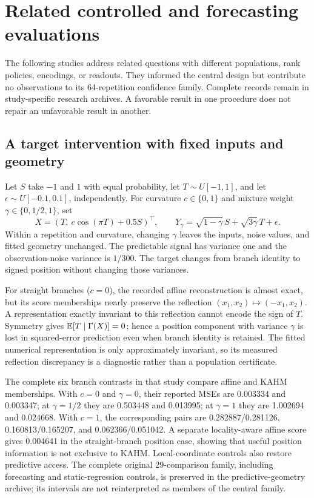 \section{Related controlled and forecasting evaluations}\label{sup:related}
The following studies address related questions with different populations, rank policies, encodings, or readouts. They informed the central design but contribute no observations to its 64-repetition confidence family. Complete records remain in study-specific research archives. A favorable result in one procedure does not repair an unfavorable result in another.

\subsection{A target intervention with fixed inputs and geometry}
Let $S$ take $-1$ and $1$ with equal probability, let $T\sim U[-1,1]$, and let $\epsilon\sim U[-0.1,0.1]$, independently. For curvature $c\in\{0,1\}$ and mixture weight $\gamma\in\{0,1/2,1\}$, set
\[
 X=(T,\ c\cos(\pi T)+0.5S)^\top,\qquad
 Y_\gamma=\sqrt{1-\gamma}\,S+\sqrt{3\gamma}\,T+\epsilon.
\]
Within a repetition and curvature, changing $\gamma$ leaves the inputs, noise values, and fitted geometry unchanged. The predictable signal has variance one and the observation-noise variance is $1/300$. The target changes from branch identity to signed position without changing those variances.

For straight branches ($c=0$), the recorded affine reconstruction is almost exact, but its score memberships nearly preserve the reflection $(x_1,x_2)\mapsto(-x_1,x_2)$. A representation exactly invariant to this reflection cannot encode the sign of $T$. Symmetry gives $\mathbb E[T\mid\Gamma(X)]=0$; hence a position component with variance $\gamma$ is lost in squared-error prediction even when branch identity is retained. The fitted numerical representation is only approximately invariant, so its measured reflection discrepancy is a diagnostic rather than a population certificate.

The complete six branch contrasts in that study compare affine and KAHM memberships. With $c=0$ and $\gamma=0$, their reported MSEs are 0.003334 and 0.003347; at $\gamma=1/2$ they are 0.503448 and 0.013995; at $\gamma=1$ they are 1.002694 and 0.024668. With $c=1$, the corresponding pairs are 0.282887/0.281126, 0.160813/0.165207, and 0.062366/0.051042. A separate locality-aware affine score gives 0.004641 in the straight-branch position case, showing that useful position information is not exclusive to KAHM. Local-coordinate controls also restore predictive access. The complete original 29-comparison family, including forecasting and static-regression controls, is preserved in the predictive-geometry archive; its intervals are not reinterpreted as members of the central family.

